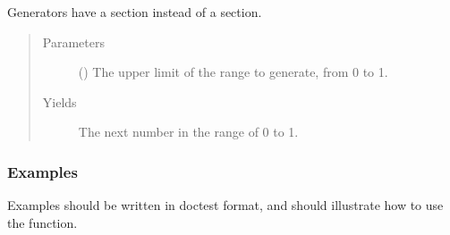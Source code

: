 \documentclass[letterpaper,10pt,english]{sphinxmanual}
\begin{document}
\begin{fulllineitems}
\label{\detokenize{source/example:example.example_generator}}
\pysigstartsignatures
{}
\pysigstopsignatures
\sphinxAtStartPar
Generators have a  section instead of a  section.
\begin{quote}\begin{description}
\item[{Parameters}] \leavevmode
\sphinxAtStartPar
{} () \textendash{} The upper limit of the range to generate, from 0 to  \sphinxhyphen{} 1.

\item[{Yields}] \leavevmode
\sphinxAtStartPar
{} \textendash{} The next number in the range of 0 to  \sphinxhyphen{} 1.

\end{description}\end{quote}
\subsubsection*{Examples}

\sphinxAtStartPar
Examples should be written in doctest format, and should illustrate how
to use the function.

\begin{sphinxVerbatim}[commandchars=\\\{\}]
\PYG{p}{[}    \PYG{p}{]}
\end{sphinxVerbatim}

\end{fulllineitems}

\end{document}
